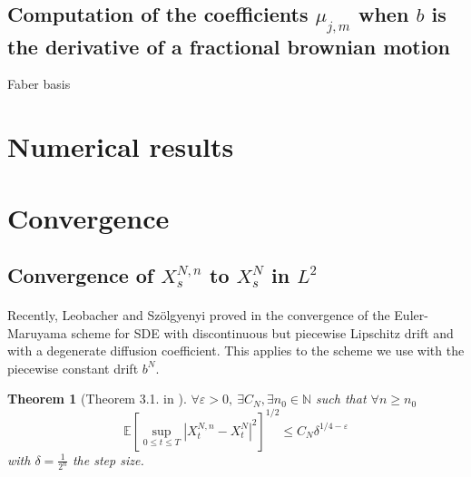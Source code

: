 \documentclass{article}[12pt]
\newtheorem{theo}{Theorem}[section]
\newcommand{\norme}[1]{\left\Vert #1\right\Vert}
\newcommand{\R}{\mathbb{R}}
\newcommand{\N}{\mathbb{N}}
\newcommand{\E}{\mathbb{E}}
\begin{document}
    \subsection{Computation of the coefficients $\mu_{j,m}$ when $b$ is the derivative of a fractional brownian motion}
        Faber basis
\section{Numerical results}
\section{Convergence} 
    
    \subsection{Convergence of $X_s^{N,n}$ to $X_s^N$ in $L^2$}
        \paragraph{}
        Recently, Leobacher and Szölgyenyi proved in \cite{Leo-Szo} the convergence of the Euler-Maruyama scheme for SDE with discontinuous but piecewise Lipschitz drift and with a degenerate diffusion coefficient. This applies to the scheme we use with the piecewise constant drift $b^N$.
    
    \begin{theo}[Theorem 3.1. in \cite{Leo-Szo}]
        $\forall \varepsilon >0,\ \exists C_N, \exists n_0\in\N$ such that $\forall n\geq n_0$
        \begin{equation}
        \E\left[\underset{0\leq t\leq T}{\sup}\left|X^{N,n}_t-X^N_t\right|^2\right]^{1/2}\leq C_N\delta^{1/4-\varepsilon}
        \end{equation}
        with $\delta=\frac{1}{2^n}$ the step size.
    \end{theo}
    
\end{document}
